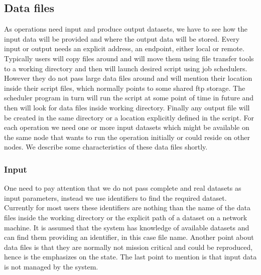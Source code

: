 \subsection{Data files}
As operations need input and produce output datasets, we have to see how the input data will be provided and where the output
data will be stored. Every input or output needs an explicit address, an endpoint, either local or remote.
Typically users will copy files around and will move them using file transfer tools to a working directory and then will
launch desired script using job schedulers. However they do not pass large data files around and will mention their location
inside their script files, which normally points to some shared ftp storage. 
The scheduler program in turn will run the script at some point of time in future and then
will look for data files inside working directory. Finally any output file will be created in the same directory or a location
explicitly defined in the script.
For each operation we need one or more input datasets which might be available on the same node that wants to run the operation
initially or could reside on other nodes. We describe some characteristics of these data files shortly.

\subsubsection{Input}
One need to pay attention that we do not pass complete and real datasets as input parameters,
instead we use identifiers to find the required dataset. Currently for most users these identifiers are nothing
than the name of the data files inside the working directory or the explicit path of a dataset on a network machine.
It is assumed that the system has knowledge of available
datasets and can find them providing an identifier, in this case file name. 
Another point about data files is that they are normally not mission critical and could be reproduced, hence is the emphasizes
on the state. The last point to mention is that input data is not managed by the system.




